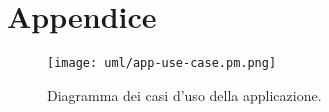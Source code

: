 \section*{Appendice}

\begin{figure}[H]
    \centering
    \texttt{[image: uml/app-use-case.pm.png]}
    \caption{Diagramma dei casi d'uso della applicazione.}
    \label{fig:app-use-case}
\end{figure}

